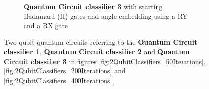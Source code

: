 \begin{figure}[!h]
\begin{subfigure}{1.0\textwidth}
        \label{fig:two_qubit_circuit_2}
    \end{subfigure}
    \\[2ex]
    \begin{subfigure}{1.0\textwidth}
        \centering
        \caption{\textbf{Quantum Circuit classifier 3} with starting Hadamard ($\mathrm{H}$) gates and angle embedding using a $\mathrm{RY}$ and a $\mathrm{RX}$ gate}
        \label{fig:two_qubit_circuit_3}
    \end{subfigure}
    
    \caption{Two qubit quantum circuits referring to the \textbf{Quantum Circuit classifier 1}, \textbf{Quantum Circuit classifier 2} and \textbf{Quantum Circuit classifier 3} in figures \ref{fig:2QubitClassifiers_50Iterations}, \ref{fig:2QubitClassifiers_200Iterations} and \ref{fig:2QubitClassifiers_400Iterations}.}
    \label{fig:two_qubit_circuits}
\end{figure}

